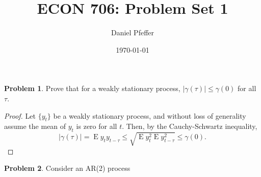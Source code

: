\documentclass[oneside,reqno]{amsart}
\title{ECON 706: Problem Set 1}
\author{Daniel Pfeffer}
\date{\today}
\DeclareMathOperator{\E}{E}
\theoremstyle{definition}
\newtheorem{prob}{Problem}
\begin{document}
\maketitle

\begin{prob}
Prove that for a weakly stationary process, $|\gamma(\tau)| \leq \gamma(0)$ for all $\tau$.
\end{prob}

\begin{proof}
Let $\{y_t\}$ be a weakly stationary process, and without loss of generality assume the mean of $y_t$ is zero for all $t$. Then, by the Cauchy-Schwartz inequality, 
\[
	| \gamma(\tau) | = \E y_t y_{t-\tau} \leq \sqrt{\E y_t^2 \E y_{t-\tau}^2} \leq \gamma(0).
\]
\end{proof}

\begin{prob}
Consider an AR(2) process
\end{prob}
\end{document}

